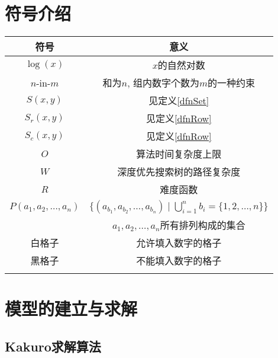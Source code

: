 \section{符号介绍}
    \begin{center}
        \begin{tabular}{cc}
            \Xhline{1.2pt}
            符号              &   意义\\
            \hline
            $\log(x)$         &   $x$的自然对数\\
            $n$-in-$m$        &   和为$n$, 组内数字个数为$m$的一种约束\\
            $S(x,y)$          &   见定义\ref{dfnSet}\\
            $S_{r}(x,y)$      &   见定义\ref{dfnRow}\\
            $S_{c}(x,y)$      &   见定义\ref{dfnRow}\\
            $O$               &   算法时间复杂度上限\\
            $W$               &   深度优先搜索树的路径复杂度\\
            $R$               &   难度函数\\
            {$P(a_{1},a_{2},\dotsc,a_{n})$}   &
                $\{(a_{b_{1}},a_{b_{2}},\dotsc,a_{b_{n}})\mid\bigcup\limits_{i=1}^n{b_{i}}=\{1,2,\dotsc,n\}\}$\\
                              &   $a_{1},a_{2},\dotsc,a_{n}$所有排列构成的集合\\
            白格子            &   允许填入数字的格子\\
            黑格子            &   不能填入数字的格子\\
            \Xhline{1.2pt}
        \end{tabular}
    \end{center}

\section{模型的建立与求解}
    \subsection{Kakuro求解算法}\label{sec1}

